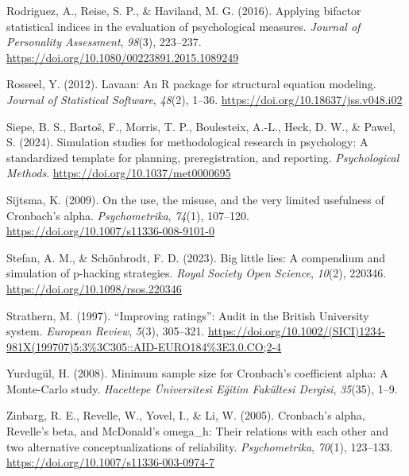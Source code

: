 \documentclass[
  nonatbib,
  authoryear,
  preprint]{elsarticle}
\newlength{\cslhangindent}
\newenvironment{CSLReferences}[2] %
 {\begin{list}{}{%
  \setlength{\itemindent}{0pt}
  \setlength{\leftmargin}{0pt}
  \setlength{\parsep}{0pt}
  \ifodd #1
   \setlength{\leftmargin}{\cslhangindent}
   \setlength{\itemindent}{-1\cslhangindent}
  \fi
  \setlength{\itemsep}{#2\baselineskip}}}
 {\end{list}}
\begin{document}
\begin{CSLReferences}{1}{0}
Rodriguez, A., Reise, S. P., \& Haviland, M. G. (2016). Applying
bifactor statistical indices in the evaluation of psychological
measures. \emph{Journal of Personality Assessment}, \emph{98}(3),
223--237. \url{https://doi.org/10.1080/00223891.2015.1089249}

Rosseel, Y. (2012). Lavaan: {An} {R} package for structural equation
modeling. \emph{Journal of Statistical Software}, \emph{48}(2), 1--36.
\url{https://doi.org/10.18637/jss.v048.i02}

Siepe, B. S., Bartoš, F., Morris, T. P., Boulesteix, A.-L., Heck, D. W.,
\& Pawel, S. (2024). Simulation studies for methodological research in
psychology: {A} standardized template for planning, preregistration, and
reporting. \emph{Psychological Methods}.
\url{https://doi.org/10.1037/met0000695}

Sijtsma, K. (2009). On the use, the misuse, and the very limited
usefulness of {Cronbach}'s alpha. \emph{Psychometrika}, \emph{74}(1),
107--120. \url{https://doi.org/10.1007/s11336-008-9101-0}

Stefan, A. M., \& Schönbrodt, F. D. (2023). Big little lies: A
compendium and simulation of p-hacking strategies. \emph{Royal Society
Open Science}, \emph{10}(2), 220346.
\url{https://doi.org/10.1098/rsos.220346}

Strathern, M. (1997). {``{Improving} ratings''}: Audit in the {British}
{University} system. \emph{European Review}, \emph{5}(3), 305--321.
\url{https://doi.org/10.1002/(SICI)1234-981X(199707)5:3\%3C305::AID-EURO184\%3E3.0.CO;2-4}

Yurdugül, H. (2008). Minimum sample size for {Cronbach}'s coefficient
alpha: {A} {Monte}-{Carlo} study. \emph{Hacettepe Üniversitesi Eğitim
Fakültesi Dergisi}, \emph{35}(35), 1--9.

Zinbarg, R. E., Revelle, W., Yovel, I., \& Li, W. (2005). Cronbach's
alpha, {Revelle}'s beta, and {McDonald}'s omega\_h: {Their} relations
with each other and two alternative conceptualizations of reliability.
\emph{Psychometrika}, \emph{70}(1), 123--133.
\url{https://doi.org/10.1007/s11336-003-0974-7}

\end{CSLReferences}
\end{document}
